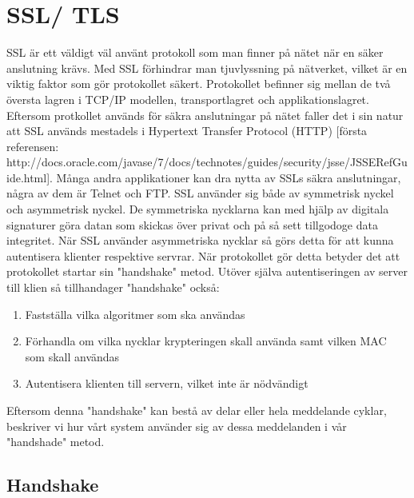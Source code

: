 \section{SSL/ TLS}

SSL är ett väldigt väl använt protokoll som man finner på nätet när en säker anslutning krävs. Med SSL förhindrar man tjuvlyssning på nätverket, vilket är en viktig faktor som gör protokollet säkert. Protokollet befinner sig mellan de två översta lagren i TCP/IP modellen, transportlagret och applikationslagret. Eftersom protkollet används för säkra anslutningar på nätet faller det i sin natur att SSL används mestadels i Hypertext Transfer Protocol (HTTP) [första referensen: http://docs.oracle.com/javase/7/docs/technotes/guides/security/jsse/JSSERefGuide.html]. Många andra applikationer kan dra nytta av SSLs säkra anslutningar, några av dem är Telnet och FTP. 
SSL använder sig både av symmetrisk nyckel och asymmetrisk nyckel. De symmetriska nycklarna kan med hjälp av digitala signaturer göra datan som skickas över privat och på så sett tillgodoge data integritet.
När SSL använder asymmetriska nycklar så görs detta för att kunna autentisera klienter respektive servrar. När protokollet gör detta betyder det att protokollet startar sin "handshake" metod. Utöver själva autentiseringen av server till klien så tillhandager "handshake" också:

\begin{enumerate}
\item{Fastställa vilka algoritmer som ska användas}
\item{Förhandla om vilka nycklar krypteringen skall använda samt vilken MAC som skall användas}
\item{Autentisera klienten till servern, vilket inte är nödvändigt}
\end{enumerate}

Eftersom denna "handshake" kan bestå av delar eller hela meddelande cyklar, beskriver vi hur vårt system använder sig av dessa meddelanden i vår "handshade" metod.

\subsection{Handshake}